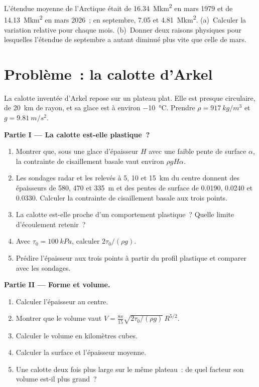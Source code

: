 \begin{exercise}[$\star\star\star$]\label{exo:b3:glaciology:12}
L'étendue moyenne de l'Arctique était de \qty{16.34}{\mega km^2} en mars 1979 et
de \qty{14.13}{\mega km^2} en mars 2026~; en septembre, \num{7.05} et
\qty{4.81}{\mega km^2}. (a)~Calculer la variation relative pour chaque mois.
(b)~Donner deux raisons physiques pour lesquelles l'étendue de septembre a autant
diminué plus vite que celle de mars.
\end{exercise}

\section{Problème~: la calotte d'Arkel}

\begin{problem}
\label{pb:b3:glaciology:1}
La calotte inventée d'Arkel repose sur un plateau plat. Elle est presque circulaire,
de \qty{20}{km} de rayon, et sa glace est à environ \qty{-10}{\celsius}. Prendre
$\rho = \qty{917}{kg/m^3}$ et $g = \qty{9.81}{m/s^2}$.

\medskip\noindent\textbf{Partie I --- La calotte est-elle plastique~?}
\begin{enumerate}
\item Montrer que, sous une glace d'épaisseur $H$ avec une faible pente de surface
  $\alpha$, la contrainte de cisaillement basale vaut environ $\rho gH\alpha$.
\item Les sondages radar et les relevés à 5, 10 et \qty{15}{km} du centre donnent
  des épaisseurs de 580, 470 et \qty{335}{m} et des pentes de surface de
  \num{0.0190}, \num{0.0240} et \num{0.0330}. Calculer la contrainte de cisaillement
  basale aux trois points.
\item La calotte est-elle proche d'un comportement plastique~? Quelle limite d'écoulement retenir~?
\item Avec $\tau_0 = \qty{100}{kPa}$, calculer $2\tau_0/(\rho g)$.
\item Prédire l'épaisseur aux trois points à partir du profil plastique
  et comparer avec les sondages.
\end{enumerate}

\medskip\noindent\textbf{Partie II --- Forme et volume.}
\begin{enumerate}[resume]
\item Calculer l'épaisseur au centre.
\item Montrer que le volume vaut $V = \frac{8\pi}{15}\sqrt{2\tau_0/(\rho
  g)}\,R^{5/2}$.
\item Calculer le volume en kilomètres cubes.
\item Calculer la surface et l'épaisseur moyenne.
\item Une calotte deux fois plus large sur le même plateau~: de quel facteur son
  volume est-il plus grand~?
\end{enumerate}


\end{problem}
